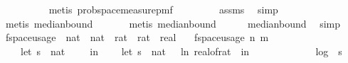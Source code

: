 \begin{isabellebody}
\ \ \ \ \ \ \ \ \isamarkupfalse%
\ {\isacharparenleft}{\kern0pt}metis\ prob{\isacharunderscore}{\kern0pt}space{\isacharunderscore}{\kern0pt}measure{\isacharunderscore}{\kern0pt}pmf{\isacharparenright}{\kern0pt}\isanewline
\ \ \ \ \ \ \ \isamarkupfalse%
\ assms\ \isamarkupfalse%
\ simp\ \isanewline
\ \ \ \ \ \ \isamarkupfalse%
\ {\isacharparenleft}{\kern0pt}metis\ median{\isacharunderscore}{\kern0pt}bound{\isacharunderscore}{\kern0pt}{}{\isacharprime}{\kern0pt}{\isacharparenright}{\kern0pt}\isanewline
\ \ \ \ \ \isamarkupfalse%
\ {\isacharparenleft}{\kern0pt}metis\ median{\isacharunderscore}{\kern0pt}bound{\isacharunderscore}{\kern0pt}{}{\isacharparenright}{\kern0pt}\isanewline
\ \ \ \ \isamarkupfalse%
\ median{\isacharunderscore}{\kern0pt}bound{\isacharunderscore}{\kern0pt}{}\ \isamarkupfalse%
\ simp\isanewline
{}\isamarkupfalse%
%
\endisatagproof
{\isafoldproof}%
%
\isadelimproof
\isanewline
%
\endisadelimproof
\isanewline
{}\isamarkupfalse%
\ f{}{\isacharunderscore}{\kern0pt}space{\isacharunderscore}{\kern0pt}usage\ {\isacharcolon}{\kern0pt}{\isacharcolon}{\kern0pt}\ {\isachardoublequoteopen}{\isacharparenleft}{\kern0pt}nat\ {\isasymtimes}\ nat\ {\isasymtimes}\ rat\ {\isasymtimes}\ rat{\isacharparenright}{\kern0pt}\ {\isasymRightarrow}\ real{\isachardoublequoteclose}\ \isanewline
\ \ {\isachardoublequoteopen}f{}{\isacharunderscore}{\kern0pt}space{\isacharunderscore}{\kern0pt}usage\ {\isacharparenleft}{\kern0pt}n{\isacharcomma}{\kern0pt}\ m{\isacharcomma}{\kern0pt}\ {\isasymepsilon}{\isacharcomma}{\kern0pt}\ {\isasymdelta}{\isacharparenright}{\kern0pt}\ {\isacharequal}{\kern0pt}\ {\isacharparenleft}{\kern0pt}\isanewline
\ \ \ \ let\ s\ {\isacharequal}{\kern0pt}\ nat\ {\isasymlceil}{}\ {\isacharslash}{\kern0pt}\ {\isasymdelta}\ {\isasymrceil}\ in\isanewline
\ \ \ \ let\ s\ {\isacharequal}{\kern0pt}\ nat\ {\isasymlceil}{\isacharminus}{\kern0pt}{\isacharparenleft}{\kern0pt}{}{}\ {\isacharasterisk}{\kern0pt}\ ln\ {\isacharparenleft}{\kern0pt}real{\isacharunderscore}{\kern0pt}of{\isacharunderscore}{\kern0pt}rat\ {\isasymepsilon}{\isacharparenright}{\kern0pt}{\isacharparenright}{\kern0pt}{\isasymrceil}\ in\ \isanewline
\ \ \ \ {}\ {\isacharplus}{\kern0pt}\isanewline
\ \ \ \ {}\ {\isacharasterisk}{\kern0pt}\ log\ {}\ {\isacharparenleft}{\kern0pt}s\ {\isacharplus}{\kern0pt}\ {}{\isacharparenright}{\kern0pt}\ {\isacharplus}{\kern0pt}\isanewline

\end{isabellebody}
